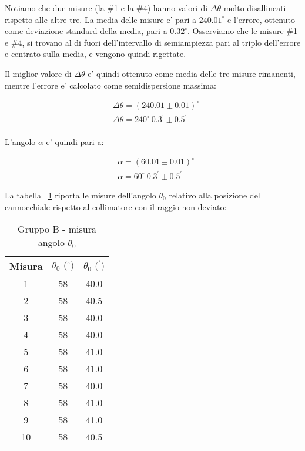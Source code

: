 Notiamo che due misure (la \#1 e la \#4) hanno valori di $\Delta \theta$ molto disallineati rispetto alle altre tre.
La media delle misure e' pari a $240.01^{\circ}$ e l'errore, ottenuto come deviazione standard della media, pari a $0.32^{\circ}$.
Osserviamo che le misure \#1 e \#4, si trovano al di fuori dell'intervallo di semiampiezza pari al triplo dell'errore e centrato sulla media, e vengono quindi rigettate.

Il miglior valore di $\Delta \theta$ e' quindi ottenuto come media delle tre misure rimanenti, mentre l'errore e' calcolato come semidispersione massima:

    \begin{align*}
        &\Delta \theta = (240.01 \pm 0.01)^{\circ} \\
        &\Delta \theta = 240^{\circ}\ 0.3^{\prime} \pm 0.5^{\prime} \\
    \end{align*}


L'angolo $\alpha$ e' quindi pari a:

    \begin{align*}
        &\alpha = (60.01 \pm 0.01)^{\circ} \\
        &\alpha = 60^{\circ} \ 0.3^{\prime} \pm 0.5^{\prime}
    \end{align*}


La tabella ~\ref{table:tbl9} riporta le misure dell'angolo $\theta_0$ relativo alla posizione del cannocchiale rispetto al collimatore con il raggio non deviato:
\begin{table}[!htbp]
    {\par\centering
    \begin{tabular}{ccc}
        \hline
        Misura & $\theta_0 \text{ ($^{\circ}$)}$ & $\theta_0 \text{ ($^{\prime}$)}$ \\
        \hline
        1   &   58 &   40.0\\
        2   &   58 &   40.5\\
        3   &   58 &   40.0\\
        4   &   58 &   40.0\\
        5   &   58 &   41.0\\
        6   &   58 &   41.0\\
        7   &   58 &   40.0\\
        8   &   58 &   41.0\\
        9   &   58 &   41.0\\
        10  &   58 &   40.5\\
        \hline
    \end{tabular}
    \par}
    \caption{Gruppo B - misura angolo $\theta_0$} \label{table:tbl9}
\end{table}

